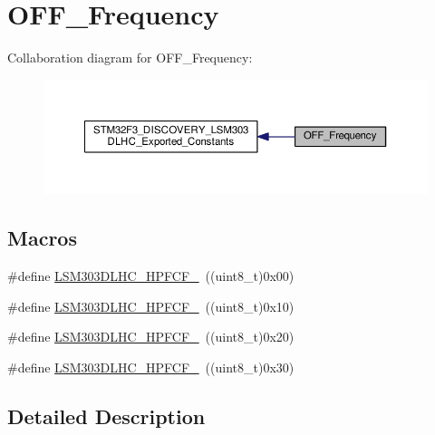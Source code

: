 \hypertarget{group__Acc__High__Pass__CUT}{\section{O\+F\+F\+\_\+\+Frequency}
\label{group__Acc__High__Pass__CUT}
}
Collaboration diagram for O\+F\+F\+\_\+\+Frequency\+:\nopagebreak
\begin{figure}[H]
\begin{center}
\leavevmode
\includegraphics[width=350pt]{group__Acc__High__Pass__CUT}
\end{center}
\end{figure}
\subsection*{Macros}
\begin{DoxyCompactItemize}
\item 
\#define \hyperlink{group__Acc__High__Pass__CUT_ga3adfe4e57bc834628ebb9b63b54949b9}{L\+S\+M303\+D\+L\+H\+C\+\_\+\+H\+P\+F\+C\+F\+\_}~((uint8\+\_\+t)0x00)
\item 
\#define \hyperlink{group__Acc__High__Pass__CUT_ga35a5f84e2ad4c5dcd951c5f751fe2d04}{L\+S\+M303\+D\+L\+H\+C\+\_\+\+H\+P\+F\+C\+F\+\_}~((uint8\+\_\+t)0x10)
\item 
\#define \hyperlink{group__Acc__High__Pass__CUT_ga16b51d6c7f0ce64075e61fff908c1f33}{L\+S\+M303\+D\+L\+H\+C\+\_\+\+H\+P\+F\+C\+F\+\_}~((uint8\+\_\+t)0x20)
\item 
\#define \hyperlink{group__Acc__High__Pass__CUT_ga23f59c658cbb4e9298fa8ede7669c5d7}{L\+S\+M303\+D\+L\+H\+C\+\_\+\+H\+P\+F\+C\+F\+\_}~((uint8\+\_\+t)0x30)
\end{DoxyCompactItemize}


\subsection{Detailed Description}


